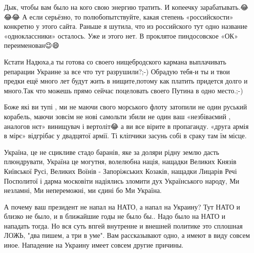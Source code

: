 Дык, чтобы вам было на кого свою энергию тратить. И копеечку
зарабатывать.😂😂😂 А если серьёзно, то полюбопытствуйте, какая степень
«российскости» конкретно у этого сайта. Раньше я шутила, что из российского тут
одно название «одноклассники» осталось. Уже и этого нет. В проклятое
пиндосовское «ОК» переименован😉😄

Кстати Надюха,а ты готова со своего нищебродского кармана выплачивать репарации
Украине за все что тут разрушили?;-) Обрадую тебя-и ты и твои предки ещё много
лет будут жить в нищите,потому как платить придется долго и много.Так что
можешь прямо сейчас поцеловать своего Путина в одно место.;-)

Боже які ви тупі , ми не маючи свого морського флоту затопили не один руський
корабель, маючи зовсім не нові самольти збили не один ваш «незбіваємий ,
аналогов нєт» винищувач і вертоліт😂 а ви все вірите в пропаганду. «друга армія
в мірє» відгрібає у двадцятої армії. Ті кліпчики засунь собі в сраку там їм
місце.

Україна, це не сцикливе стадо баранів, яке за доляри рідну землю дасть
плюндрувати, Україна це могутня, волелюбна нація, нащадки Великих Князів
Київської Русі, Великих Воїнів - Запоріжських Козаків, нащадки Лицарів Речі
Посполитої і дарма московіти надіялись зломити дух Українського народу, Ми
незламні, Ми непереможні, ми єдині бо Ми Україна.

А почему ваш президент не напал на НАТО, а напал на Украину? Тут НАТО и близко
не было, и в ближайшие годы не было бы.. Надо было на НАТО и нападать тогда. Но
вся суть впгей внутренне и внешней политике это сплошная ЛОЖЬ, "два пишем, а
три в уме". Вам рассказывают одно, а имеют в виду совсем иное. Нападение на
Украину имеет совсем другие причины.

